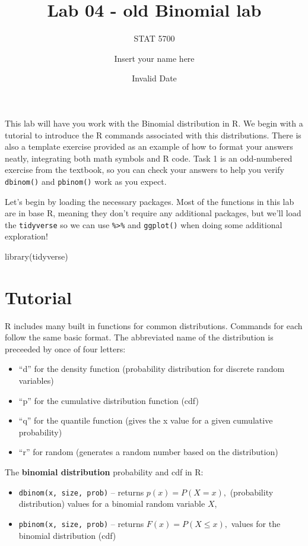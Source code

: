 \documentclass[
  letterpaper,
  DIV=11,
  numbers=noendperiod]{scrartcl}
\title{Lab 04 - old Binomial lab}
\subtitle{STAT 5700}
\author{Insert your name here}
\date{Invalid Date}
\newenvironment{Shaded}{\begin{snugshade}}{\end{snugshade}}
\newcommand{\FunctionTok}[1]{\textcolor[rgb]{0.28,0.35,0.67}{#1}}
\newcommand{\NormalTok}[1]{\textcolor[rgb]{0.00,0.23,0.31}{#1}}
\providecommand{\tightlist}{%
  \setlength{\itemsep}{0pt}\setlength{\parskip}{0pt}}
\begin{document}
\maketitle


This lab will have you work with the Binomial distribution in R. We
begin with a tutorial to introduce the R commands associated with this
distributions. There is also a template exercise provided as an example
of how to format your answers neatly, integrating both math symbols and
R code. Task 1 is an odd-numbered exercise from the textbook, so you can
check your answers to help you verify \texttt{dbinom()} and
\texttt{pbinom()} work as you expect.

Let's begin by loading the necessary packages. Most of the functions in
this lab are in base R, meaning they don't require any additional
packages, but we'll load the \texttt{tidyverse} so we can use
\texttt{\%\textgreater{}\%} and \texttt{ggplot()} when doing some
additional exploration!

\begin{Shaded}
\begin{Highlighting}[]
\FunctionTok{library}\NormalTok{(tidyverse)}
\end{Highlighting}
\end{Shaded}

\section{Tutorial}\label{tutorial}

R includes many built in functions for common distributions. Commands
for each follow the same basic format. The abbreviated name of the
distribution is preceeded by once of four letters:

\begin{itemize}
\tightlist
\item
  ``d'' for the density function (probability distribution for discrete
  random variables)
\item
  ``p'' for the cumulative distribution function (cdf)
\item
  ``q'' for the quantile function (gives the x value for a given
  cumulative probability)
\item
  ``r'' for random (generates a random number based on the distribution)
\end{itemize}

The \textbf{binomial distribution} probability and cdf in R:

\begin{itemize}
\tightlist
\item
  \texttt{dbinom(x,\ size,\ prob)} -- returns \(p(x) = P(X = x),\)
  (probability distribution) values for a binomial random variable
  \(X\),
\item
  \texttt{pbinom(x,\ size,\ prob)} -- returns \(F(x) = P(X \leq x),\)
  values for the binomial distribution (cdf)
\end{itemize}
\end{document}
